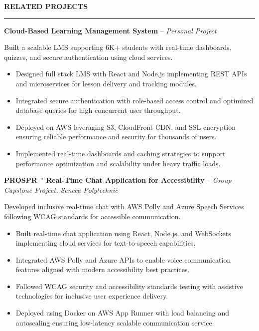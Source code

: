 \documentclass[10pt,letterpaper]{article}
\begin{document}
\vspace{6pt}

\textbf{RELATED PROJECTS}\\[-8pt]
\noindent\rule{\textwidth}{1pt}

\vspace{-2pt}

\textbf{Cloud-Based Learning Management System} -- \emph{Personal Project}

\vspace{-1pt}

Built a scalable LMS supporting 6K+ students with real-time dashboards, quizzes, and secure authentication using cloud services.
\vspace{-1pt}
\begin{itemize}
\item Designed full stack LMS with React and Node.js implementing REST APIs and microservices for lesson delivery and tracking modules.
\item Integrated secure authentication with role-based access control and optimized database queries for high concurrent user throughput.
\item Deployed on AWS leveraging S3, CloudFront CDN, and SSL encryption ensuring reliable performance and security for thousands of users.
\item Implemented real-time dashboards and caching strategies to support performance optimization and scalability under heavy traffic loads.
\end{itemize}

\textbf{PROSPR " Real-Time Chat Application for Accessibility} -- \emph{Group Capstone Project, Seneca Polytechnic}

\vspace{-1pt}

Developed inclusive real-time chat with AWS Polly and Azure Speech Services following WCAG standards for accessible communication.
\vspace{-1pt}
\begin{itemize}
\item Built real-time chat application using React, Node.js, and WebSockets implementing cloud services for text-to-speech capabilities.
\item Integrated AWS Polly and Azure APIs to enable voice communication features aligned with modern accessibility best practices.
\item Followed WCAG security and accessibility standards testing with assistive technologies for inclusive user experience delivery.
\item Deployed using Docker on AWS App Runner with load balancing and autoscaling ensuring low-latency scalable communication service.
\end{itemize}
\end{document}
